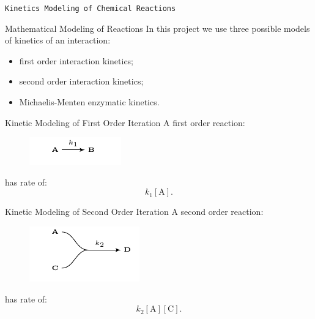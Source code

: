 \documentclass{beamer}
\begin{document}
\begin{frame}{}
\begin{center}
\texttt{Kinetics Modeling of Chemical Reactions}
\end{center}
\end{frame}

\begin{frame}{Mathematical Modeling of Reactions}
In this project we use three possible models of kinetics of an 
interaction:
\begin{itemize}
\pause
\item{first order interaction kinetics;}
\pause
\item{second order interaction kinetics;}
\pause
\item{Michaelis-Menten enzymatic kinetics.}
\end{itemize}
\end{frame}


\begin{frame}{Kinetic Modeling of First Order Iteration}
A first order reaction:
\begin{figure}
\includegraphics[scale=1.5]{fundamental_concepts/first_order_reaction.pdf}
\end{figure}
\pause
has rate of:
\begin{equation*}
k_1[\text{A}].
\end{equation*}
\end{frame}

\begin{frame}{Kinetic Modeling of Second Order Iteration}
A second order reaction:
\begin{figure}
\includegraphics[scale=1.5]{fundamental_concepts/second_order_reaction.pdf}
\end{figure}
\pause
has rate of:
\begin{equation*}
    k_2[\text{A}][\text{C}].
\end{equation*}
\end{frame}
\end{document}
